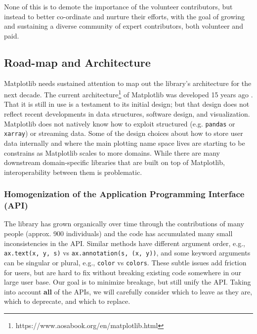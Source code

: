 \documentclass[11pt]{article}  %
\begin{document}
None of this is to demote the importance of the volunteer
contributors, but instead to better co-ordinate and nurture their
efforts, with the goal of growing and sustaining a diverse community
of expert contributors, both volunteer and paid.


\subsection{Road-map and Architecture}

Matplotlib needs sustained attention to map out the library's
architecture for the next decade.  The current
architecture\footnote{https://www.aosabook.org/en/matplotlib.html} of
Matplotlib was developed 15 years ago \cite{Hunter:2007}.  That it is
still in use is a testament to its initial design; but that design
does not reflect recent developments in data structures, software
design, and visualization.  Matplotlib does not natively know how to
exploit structured (e.g. \texttt{pandas} or \texttt{xarray}) or
streaming data.  Some of the design choices about how to store user
data internally and where the main plotting name space lives are
starting to be constrains as Matplotlib scales to more domains.  While
there are many downstream domain-specific libraries that are built on
top of Matplotlib, interoperability between them is problematic.


\subsubsection{Homogenization of the Application Programming Interface (API)}
\label{sec:api_hom}
The library has grown organically over time through the contributions
of many people (approx. 900 individuals) and the code has accumulated
many small inconsistencies in the API.  Similar methods have different
argument order, e.g., \texttt{ax.text(x, y, s)} vs
\texttt{ax.annotation(s, (x, y))}, and some keyword arguments can be
singular or plural, e.g., \texttt{color} vs \texttt{colors}.  These
subtle issues add friction for users, but are hard to fix without
breaking existing code somewhere in our large user base.  Our goal is
to minimize breakage, but still unify the API.  Taking into account
\textbf{all} of the APIs, we will carefully consider which to leave as
they are, which to deprecate, and which to replace.
\end{document}
